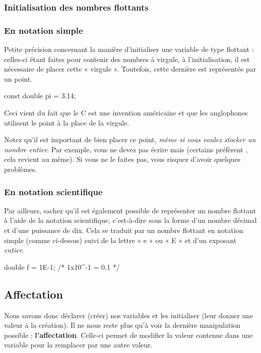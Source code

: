\subsubsection{Initialisation des nombres flottants}
\label{initialisation-des-nombres-flottants}

\subsubsection*{En notation simple}

Petite précision concernant la manière d'initialiser une variable de
type flottant : celles-ci étant faites pour contenir des nombres à
virgule, à l'initialisation, il est nécessaire de placer cette «
virgule ». Toutefois, cette dernière est représentée par un point.

\begin{C}
const double pi = 3.14;
\end{C}

Ceci vient du fait que le C est une invention américaine et que les
anglophones utilisent le point à la place de la virgule.

Notez qu'il est important de bien placer ce point, \emph{même si vous
  voulez stocker un nombre entier}. Par exemple, vous ne devez pas
écrire  mais  (certains
préfèrent , cela revient au même). Si vous ne le
faites pas, vous risquez d'avoir quelques problèmes.

\subsubsection*{En notation scientifique}

Par ailleurs, sachez qu'il est également possible de représenter un
nombre flottant à l'aide de la notation scientifique, c'est-à-dire
sous la forme d'un nombre décimal et d'une puissance de dix. Cela se
traduit par un nombre flottant en notation simple (comme ci-dessus)
suivi de la lettre « e » ou « E » et d'un exposant \emph{entier}.

\begin{C}
double f = 1E-1; /* 1x10^-1 = 0.1 */
\end{C}

\subsection{Affectation}\label{affectation}

Nous savons donc déclarer (créer) nos variables et les initialiser
(leur donner une valeur à la création). Il ne nous reste plus qu'à
voir la dernière manipulation possible :
\textbf{l'affectation}. Celle-ci permet de modifier la valeur contenue
dans une variable pour la remplacer par une autre valeur.

